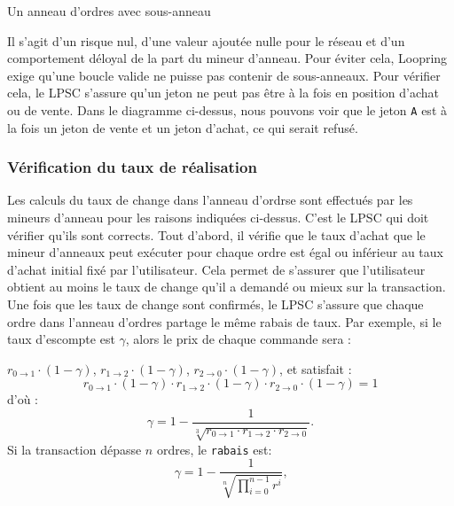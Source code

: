 \documentclass[UTF8,nofonts]{article}
\makeatletter
\newenvironment{figurehere}
 {\def\@captype{figure}}
 {}
\makeatother
\begin{document}
\begin{multicols}{2}
\begin{center}
\begin{figurehere}
\caption{Un anneau d'ordres avec sous-anneau}
\label{fig:subring}
\end{figurehere}
\end{center}

Il s'agit d'un risque nul, d'une valeur ajoutée nulle pour le réseau et d'un comportement déloyal de la part du mineur d’anneau. Pour éviter cela, Loopring exige qu'une boucle valide ne puisse pas contenir de sous-anneaux. Pour vérifier cela, le LPSC s'assure qu'un jeton ne peut pas être à la fois en position d'achat ou de vente. Dans le diagramme ci-dessus, nous pouvons voir que le jeton \verb|A| est à la fois un jeton de vente et un jeton d'achat, ce qui serait refusé.


\subsubsection{
Vérification du taux de réalisation\label{sec:fill_rate_check}}


Les calculs du taux de change dans l'anneau d'ordrse sont effectués par les mineurs d'anneau pour les raisons indiquées ci-dessus. C'est le LPSC qui doit vérifier qu'ils sont corrects. Tout d'abord, il vérifie que le taux d'achat que le mineur d’anneaux peut exécuter pour chaque ordre est égal ou inférieur au taux d'achat initial fixé par l'utilisateur. Cela permet de s'assurer que l'utilisateur obtient au moins le taux de change qu'il a demandé ou mieux sur la transaction. Une fois que les taux de change sont confirmés, le LPSC s'assure que chaque ordre dans l'anneau d'ordres partage le même rabais de taux. Par exemple, si le taux d'escompte est $\gamma$, alors le prix de chaque commande sera :

$r_{0\rightarrow 1} \cdot (1-\gamma)$, $r_{1\rightarrow 2} \cdot (1-\gamma)$, $r_{2 \rightarrow 0} \cdot (1-\gamma)$, et satisfait : 
\begin{equation}
r_{0\rightarrow 1} \cdot (1-\gamma)\cdot r_{1\rightarrow 2} \cdot (1-\gamma) \cdot r_{2 \rightarrow 0} \cdot (1-\gamma) = 1
\end{equation}
d'où : 
\begin{equation}
\gamma = 1- \frac{1}{\sqrt[3]{r_{0\rightarrow 1} \cdot r_{1\rightarrow 2} \cdot r_{2\rightarrow 0}}}\text{.}
\end{equation}
Si la transaction dépasse $n$ ordres, le \texttt{rabais} est: 
\begin{equation}
\gamma = 1- \frac{1}{\sqrt[n]{\prod_{i=0}^{n-1} r^i}} \text{,}
\end{equation}


\end{multicols}
\end{document}

